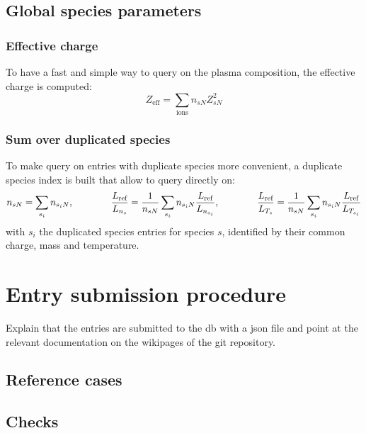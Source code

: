 \documentclass[a4paper]{report}
\begin{document}
\section{Global species parameters}
\subsection{Effective charge} \label{sec:zeff}
To have a fast and simple way to query on the plasma composition, the effective charge is computed:
$$Z_\textrm{eff} = \sum_\textrm{ions} n_{sN}Z_{sN}^2$$ 

\subsection{Sum over duplicated species}
To make query on entries with duplicate species more convenient, a duplicate species index is built that allow to query directly on:
$$n_{sN}=\sum_{s_i}n_{s_iN}, \qquad \qquad \frac{L_{\textrm{ref}}}{L_{n_s}}=\frac{1}{n_{sN}}\sum_{s_i}n_{s_iN}\frac{L_{\textrm{ref}}}{L_{n_{s_i}}}, \qquad \qquad \frac{L_{\textrm{ref}}}{L_{T_s}}=\frac{1}{n_{sN}}\sum_{s_i}n_{s_iN}\frac{L_{\textrm{ref}}}{L_{T_{s_i}}}$$
with $s_i$ the duplicated species entries for species $s$, identified by their common charge, mass and temperature.


\chapter{Entry submission procedure}

Explain that the entries are submitted to the db with a json file and point at the relevant documentation on the wikipages of the git repository.
\section{Reference cases}

\section{Checks}
\end{document}
